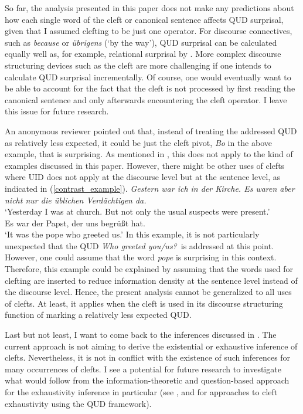 \documentclass[output=paper,colorlinks,citecolor=brown]{langscibook}
\begin{document}
So far, the analysis presented in this paper does not make any predictions about how each single word of the cleft or canonical sentence affects QUD surprisal, given that I assumed clefting to be just one operator. For discourse connectives, such as \textit{because} or \textit{übrigens} (`by the way'), QUD surprisal can be calculated equally well as, for example, relational surprisal by \citet{asr_demberg_2015}. More complex discourse structuring devices such as the cleft are more challenging if one intends to calculate QUD surprisal incrementally. Of course, one would eventually want to be able to account for the fact that the cleft is not processed by first reading the canonical sentence and only afterwards encountering the cleft operator. I leave this issue for future research.

\largerpage
An anonymous reviewer pointed out that, instead of treating the addressed QUD as relatively less expected, it could be just the cleft pivot, \textit{Bo} in the above example, that is surprising. As mentioned in , this does not apply to the kind of examples discussed in this paper. However, there might be other uses of clefts where UID does not apply at the discourse level but at the sentence level, as indicated in (\ref{contrast_example}).
\ea\label{contrast_example} \textit{Gestern war ich in der Kirche. Es waren aber nicht nur die üblichen Verdächtigen da.}\\
`Yesterday I was at church. But not only the usual suspects were present.'\\\vspace{1ex}
Es war der Papst, der uns begrüßt hat.\\
`It was the pope who greeted us.'
\z
In this example, it is not particularly unexpected that the QUD \textit{Who greeted you/us?}~is addressed at this point. However, one could assume that the word \textit{pope} is surprising in this context. Therefore, this example could be explained by assuming that the words used for clefting are inserted to reduce information density at the sentence level instead of the discourse level. Hence, the present analysis cannot be generalized to all uses of clefts. At least, it applies when the cleft is used in its discourse structuring function of marking a relatively less expected QUD.

Last but not least, I want to come back to the inferences discussed in . The current approach is not aiming to derive the existential or exhaustive inference of clefts. Nevertheless, it is not in conflict with the existence of such inferences for many occurrences of clefts. I see a potential for future research to investigate what would follow from the information-theoretic and question-based approach for the exhaustivity inference in particular (see \cite{velleman_et_al_2012}, \cite{pollard_yasavul_2015} and \cite{deveaugh-geiss_et_al_2018b} for approaches to cleft exhaustivity using the QUD framework). 
\end{document}
